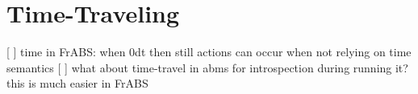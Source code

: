\section{Time-Traveling}
\cite{perez_back_2017}

[ ] time in FrABS: when 0dt then still actions can occur when not relying on time semantics
[ ] what about time-travel in abms for introspection during running it? this is much easier in FrABS
